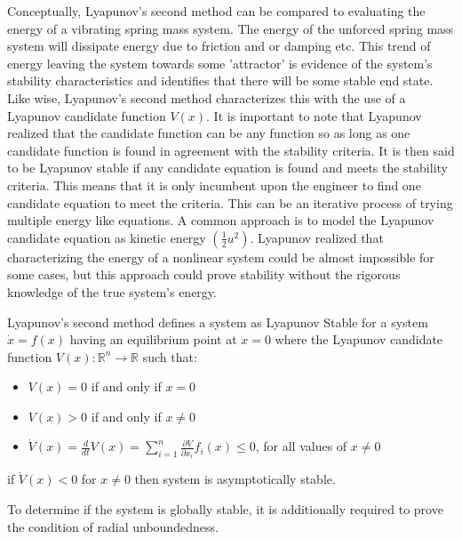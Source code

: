 Conceptually, Lyapunov's second method can be compared to evaluating the energy of a vibrating spring mass system.  The energy of the unforced spring mass system will dissipate energy due to friction and or damping etc.  This trend of energy leaving the system towards some 'attractor' is evidence of the system's stability characteristics and identifies that there will be some stable end state.  Like wise, Lyapunov's second method characterizes this with the use of a Lyapunov candidate function $V(x)$.  It is important to note that Lyapunov realized that the candidate function can be any function so as long as one candidate function is found in agreement with the stability criteria.  It is then said to be Lyapunov stable if any candidate equation is found and meets the stability criteria.  This means that it is only incumbent upon the engineer to find one candidate equation to meet the criteria.  This can be an iterative process of trying multiple energy like equations.  A common approach is to model the Lyapunov candidate equation as kinetic energy $(\frac{1}{2}u^2)$.  Lyapunov realized that characterizing the energy of a nonlinear system could be almost impossible for some cases, but this approach could prove stability without the rigorous knowledge of the true system's energy.

Lyapunov's second method defines a system as Lyapunov Stable for a system $\dot{x}=f(x)$ having an equilibrium point at $x=0$ where the Lyapunov candidate function $V(x):\mathbb{R}^n \rightarrow \mathbb{R}$ such that:
\begin{itemize}
	\item $V(x)=0$ if and only if $x=0$
	\item $V(x)>0$ if and only if $x\neq0$
	\item $\dot{V}(x)=\frac{d}{dt}V(x)=\sum\limits_{i=1}^{n} \frac{\partial V}{\partial x_i}f_i(x) \leq 0$, for all values of $x\neq 0$		
\end{itemize}

if $\dot{V}(x) < 0$ for $x\neq 0$ then system is asymptotically stable.

To determine if the system is globally stable, it is additionally required to prove the condition of radial unboundedness.


